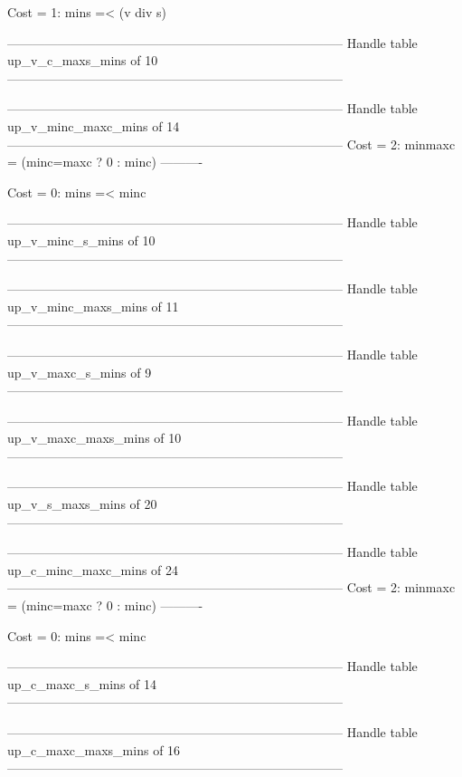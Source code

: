 Cost =  1:  mins =< (v div s)

--------------------------------------------------------------------------------
Handle table up_v_c_maxs_mins of 10
--------------------------------------------------------------------------------


--------------------------------------------------------------------------------
Handle table up_v_minc_maxc_mins of 14
--------------------------------------------------------------------------------
Cost =  2:  minmaxc = (minc=maxc ? 0 : minc)
----------

Cost =  0:  mins =< minc

--------------------------------------------------------------------------------
Handle table up_v_minc_s_mins of 10
--------------------------------------------------------------------------------


--------------------------------------------------------------------------------
Handle table up_v_minc_maxs_mins of 11
--------------------------------------------------------------------------------


--------------------------------------------------------------------------------
Handle table up_v_maxc_s_mins of 9
--------------------------------------------------------------------------------


--------------------------------------------------------------------------------
Handle table up_v_maxc_maxs_mins of 10
--------------------------------------------------------------------------------


--------------------------------------------------------------------------------
Handle table up_v_s_maxs_mins of 20
--------------------------------------------------------------------------------


--------------------------------------------------------------------------------
Handle table up_c_minc_maxc_mins of 24
--------------------------------------------------------------------------------
Cost =  2:  minmaxc = (minc=maxc ? 0 : minc)
----------

Cost =  0:  mins =< minc

--------------------------------------------------------------------------------
Handle table up_c_maxc_s_mins of 14
--------------------------------------------------------------------------------


--------------------------------------------------------------------------------
Handle table up_c_maxc_maxs_mins of 16
--------------------------------------------------------------------------------


